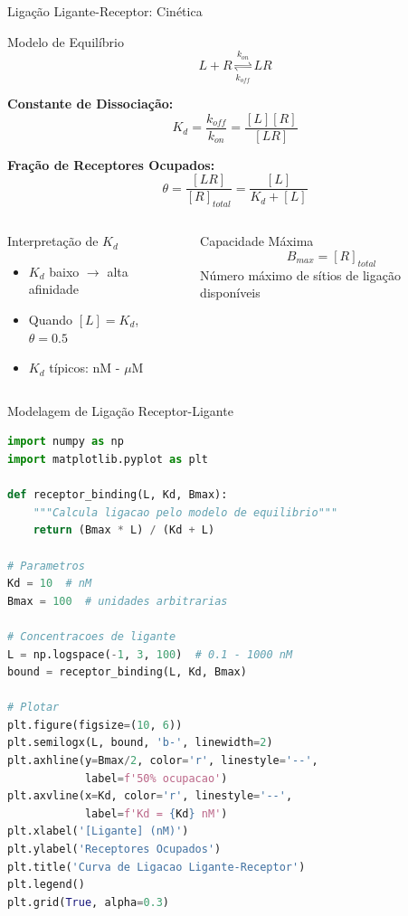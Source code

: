 \begin{frame}{Ligação Ligante-Receptor: Cinética}
\begin{block}{Modelo de Equilíbrio}
\begin{equation*}
L + R \underset{k_{off}}{\overset{k_{on}}{\rightleftharpoons}} LR
\end{equation*}

\textbf{Constante de Dissociação:}
\begin{equation*}
K_d = \frac{k_{off}}{k_{on}} = \frac{[L][R]}{[LR]}
\end{equation*}

\textbf{Fração de Receptores Ocupados:}
\begin{equation*}
\theta = \frac{[LR]}{[R]_{total}} = \frac{[L]}{K_d + [L]}
\end{equation*}
\end{block}

\begin{columns}
\begin{exampleblock}{Interpretação de $K_d$}
\begin{itemize}
    \item $K_d$ baixo $\rightarrow$ alta afinidade
    \item Quando $[L] = K_d$, $\theta = 0.5$
    \item $K_d$ típicos: nM - $\mu$M
\end{itemize}
\end{exampleblock}

\begin{exampleblock}{Capacidade Máxima}
\begin{equation*}
B_{max} = [R]_{total}
\end{equation*}
Número máximo de sítios de ligação disponíveis
\end{exampleblock}
\end{columns}
\end{frame}

\begin{frame}[fragile]{Modelagem de Ligação Receptor-Ligante}
\begin{lstlisting}[language=Python, caption=Curva de ligação, basicstyle=\ttfamily\footnotesize]
import numpy as np
import matplotlib.pyplot as plt

def receptor_binding(L, Kd, Bmax):
    """Calcula ligacao pelo modelo de equilibrio"""
    return (Bmax * L) / (Kd + L)

# Parametros
Kd = 10  # nM
Bmax = 100  # unidades arbitrarias

# Concentracoes de ligante
L = np.logspace(-1, 3, 100)  # 0.1 - 1000 nM
bound = receptor_binding(L, Kd, Bmax)

# Plotar
plt.figure(figsize=(10, 6))
plt.semilogx(L, bound, 'b-', linewidth=2)
plt.axhline(y=Bmax/2, color='r', linestyle='--',
            label=f'50% ocupacao')
plt.axvline(x=Kd, color='r', linestyle='--',
            label=f'Kd = {Kd} nM')
plt.xlabel('[Ligante] (nM)')
plt.ylabel('Receptores Ocupados')
plt.title('Curva de Ligacao Ligante-Receptor')
plt.legend()
plt.grid(True, alpha=0.3)
\end{lstlisting}
\end{frame}


